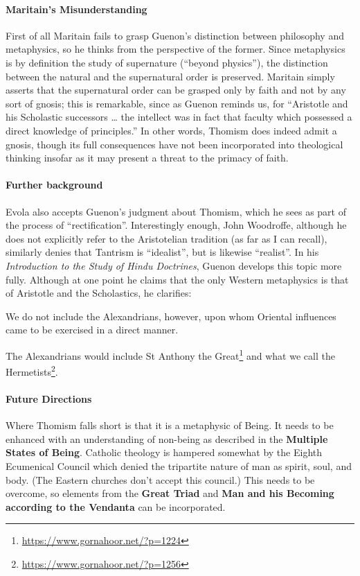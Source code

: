\paragraph{Maritain's Misunderstanding}
First of all Maritain fails to grasp Guenon's distinction between philosophy and metaphysics, so he thinks from the perspective of the former. Since metaphysics is by definition the study of supernature (“beyond physics”), the distinction between the natural and the supernatural order is preserved. Maritain simply asserts that the supernatural order can be grasped only by faith and not by any sort of gnosis; this is remarkable, since as Guenon reminds us, for “Aristotle and his Scholastic successors … the intellect was in fact that faculty which possessed a direct knowledge of principles.” In other words, Thomism does indeed admit a gnosis, though its full consequences have not been incorporated into theological thinking insofar as it may present a threat to the primacy of faith.

\paragraph{Further background}
Evola also accepts Guenon's judgment about Thomism, which he sees as part of the process of “rectification”. Interestingly enough, John Woodroffe, although he does not explicitly refer to the Aristotelian tradition (as far as I can recall), similarly denies that Tantrism is “idealist”, but is likewise “realist”. In his \emph{Introduction to the Study of Hindu Doctrines}, Guenon develops this topic more fully. Although at one point he claims that the only Western metaphysics is that of Aristotle and the Scholastics, he clarifies: 

\begin{quotex}
We do not include the Alexandrians, however, upon whom Oriental influences came to be exercised in a direct manner. 

\end{quotex}
The Alexandrians would include St Anthony the Great\footnote{\url{https://www.gornahoor.net/?p=1224}} and what we call the Hermetists\footnote{\url{https://www.gornahoor.net/?p=1256}}.

\paragraph{Future Directions}
Where Thomism falls short is that it is a metaphysic of Being. It needs to be enhanced with an understanding of non-being as described in the \textbf{Multiple States of Being}. Catholic theology is hampered somewhat by the Eighth Ecumenical Council which denied the tripartite nature of man as spirit, soul, and body. (The Eastern churches don't accept this council.) This needs to be overcome, so elements from the \textbf{Great Triad} and \textbf{Man and his Becoming according to the Vendanta} can be incorporated.


